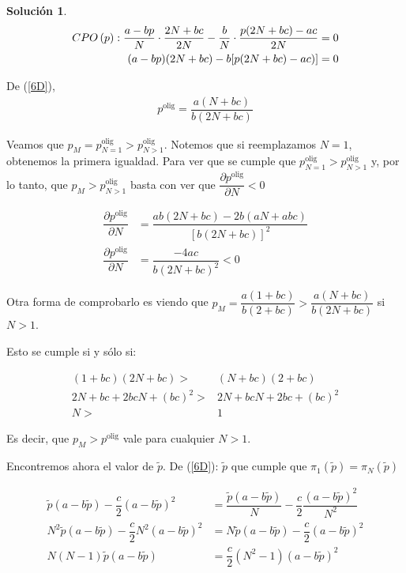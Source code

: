 \documentclass[a4paper, 11pt]{article}
\theoremstyle{definition}
\newtheorem{solucion}{Soluci\'on}
\begin{document}
\begin{solucion}
\begin{align*}
CPO \, (p): \dfrac{a-bp}{N}\cdot\dfrac{2N+bc}{2N}-\dfrac{b}{N}\cdot\dfrac{p(2N+bc)-ac}{2N}=0\\
\vspace{6pt}
(a-bp)(2N+bc)-b[p(2N+bc)-ac)]=0
\end{align*}


De (\ref{6D}),
\vspace{-8pt}
\begin{align*}
p^{\text{olig}}=\dfrac{a(N+bc)}{b(2N+bc)}
\end{align*}

Veamos que $p_M=p_{N=1}^{\text{olig}}>p_{N>1}^{\text{olig}}$. Notemos que si reemplazamos $N=1$, obtenemos la primera igualdad. Para ver que se cumple que $p_{N=1}^{\text{olig}}>p_{N>1}^{\text{olig}}$ y, por lo tanto, que $p_M>p_{N>1}^{\text{olig}}$ basta con ver que $\dfrac{\partial p^{\text{olig}}}{\partial N}<0$

\begin{align*}
\dfrac{\partial p^{\text{olig}}}{\partial N}&=\dfrac{ab(2N+bc)-2b(aN+abc)}{[b(2N+bc)]^2}\\
\dfrac{\partial p^{\text{olig}}}{\partial N}&= \dfrac{-4ac}{b(2N+bc)^2}<0
\end{align*}

Otra forma de comprobarlo es viendo que $p_M=\dfrac{a(1+bc)}{b(2+bc)}>\dfrac{a(N+bc)}{b(2N+bc)}$ si $N>1$.

Esto se cumple si y sólo si:

\vspace*{-28pt}

\begin{align*}
 (1+bc)(2N+bc)>&(N+bc)(2+bc)\\
2N+bc+2bcN+(bc)^2>&2N+bcN+2bc+(bc)^2\\
N>&1
\end{align*}

Es decir, que $p_M>p^{\text{olig}}$ vale para cualquier $N>1$.

Encontremos ahora el valor de $\widetilde{p}.$ De (\ref{6D}): $\widetilde{p} \text{ que cumple que } \pi_1(\widetilde{p})=\pi_N(\widetilde{p})$

\vspace*{-20pt}

\begin{align*}
\widetilde{p}(a-b\widetilde{p})-\dfrac{c}{2}(a-b\widetilde{p})^2&=\dfrac{\widetilde{p}(a-b\widetilde{p})}{N}-\dfrac{c}{2}\dfrac{(a-b\widetilde{p})^2}{N^2}\\
N^2\widetilde{p}(a-b\widetilde{p})-\dfrac{c}{2}N^2(a-b\widetilde{p})^2&=N\widetilde{p}(a-b\widetilde{p})-\dfrac{c}{2}(a-b\widetilde{p})^2\\
N(N-1)\widetilde{p}(a-b\widetilde{p})&=\dfrac{c}{2}(N^2-1)(a-b\widetilde{p})^2
\end{align*}


\end{solucion}
\end{document}
